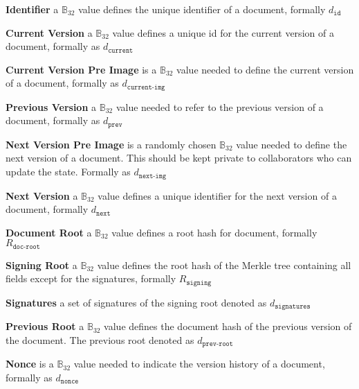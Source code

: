 \begin{description} 
\item{\textbf{Identifier}} a $\mathbb{B}_{32}$ value defines the unique identifier of a document, formally $d_{\texttt{id}}$ 
\item{\textbf{Current Version}} a $\mathbb{B}_{32}$ value defines a unique id for the current version of a document, formally as $d_{\texttt{current}}$
\item{\textbf{Current Version Pre Image}} is a $\mathbb{B}_{32}$ value needed to define the current version of a document,  formally as $d_{\texttt{current-img}}$
\item{\textbf{Previous Version}} a $\mathbb{B}_{32}$ value needed to refer to the previous version of a document, formally as $d_{\texttt{prev}}$
\item{\textbf{Next Version Pre Image}} is a randomly chosen $\mathbb{B}_{32}$ value needed to define the next version of a document. This should be kept private to collaborators who can update the state. Formally as $d_{\texttt{next-img}}$
\item{\textbf{Next Version}} a $\mathbb{B}_{32}$ value defines a unique identifier for the next version of a document, formally $d_{\texttt{next}}$
\item{\textbf{Document Root}} a $\mathbb{B}_{32}$ value defines a root hash for document, formally $R_{\texttt{doc-root}}$
\item{\textbf{Signing Root}} a $\mathbb{B}_{32}$ value defines the root hash of the Merkle tree containing all fields except for the signatures, formally $R_{\texttt{signing}}$
\item{\textbf{Signatures}} a set of signatures of the signing root denoted as $d_{\texttt{signatures}}$
\item{\textbf{Previous Root}} a $\mathbb{B}_{32}$ value defines the document hash of the previous version of the document. The previous root denoted as $d_{\texttt{prev-root}}$
\item{\textbf{Nonce}} is a $\mathbb{B}_{32}$ value needed to indicate the version history of a document,  formally as $d_{\texttt{nonce}}$
\end{description}

